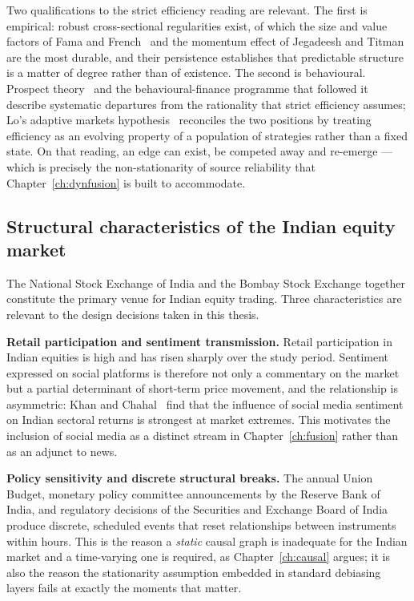 Two qualifications to the strict efficiency reading are relevant. The first is empirical: robust
cross-sectional regularities exist, of which the size and value factors of Fama and
French~\cite{famafrench1993} and the momentum effect of Jegadeesh and
Titman~\cite{jegadeesh1993} are the most durable, and their persistence establishes that
predictable structure is a matter of degree rather than of existence. The second is behavioural.
Prospect theory~\cite{kahneman1979} and the behavioural-finance programme that followed
it~\cite{shiller2003} describe systematic departures from the rationality that strict efficiency
assumes; Lo's adaptive markets hypothesis~\cite{lo2004} reconciles the two positions by treating
efficiency as an evolving property of a population of strategies rather than a fixed state. On
that reading, an edge can exist, be competed away and re-emerge --- which is precisely the
non-stationarity of source reliability that Chapter~\ref{ch:dynfusion} is built to accommodate.

\subsection{Structural characteristics of the Indian equity market}

The National Stock Exchange of India and the Bombay Stock Exchange together constitute the
primary venue for Indian equity trading. Three characteristics are relevant to the design
decisions taken in this thesis.

\textbf{Retail participation and sentiment transmission.} Retail participation in Indian
equities is high and has risen sharply over the study period. Sentiment expressed on social
platforms is therefore not only a commentary on the market but a partial determinant of
short-term price movement, and the relationship is asymmetric: Khan and
Chahal~\cite{khan2025asymmetric} find that the influence of social media sentiment on Indian
sectoral returns is strongest at market extremes. This motivates the inclusion of social media
as a distinct stream in Chapter~\ref{ch:fusion} rather than as an adjunct to news.

\textbf{Policy sensitivity and discrete structural breaks.} The annual Union Budget, monetary
policy committee announcements by the Reserve Bank of India, and regulatory decisions of the
Securities and Exchange Board of India produce discrete, scheduled events that reset
relationships between instruments within hours. This is the reason a \emph{static} causal
graph is inadequate for the Indian market and a time-varying one is required, as
Chapter~\ref{ch:causal} argues; it is also the reason the stationarity assumption embedded in
standard debiasing layers fails at exactly the moments that matter.

